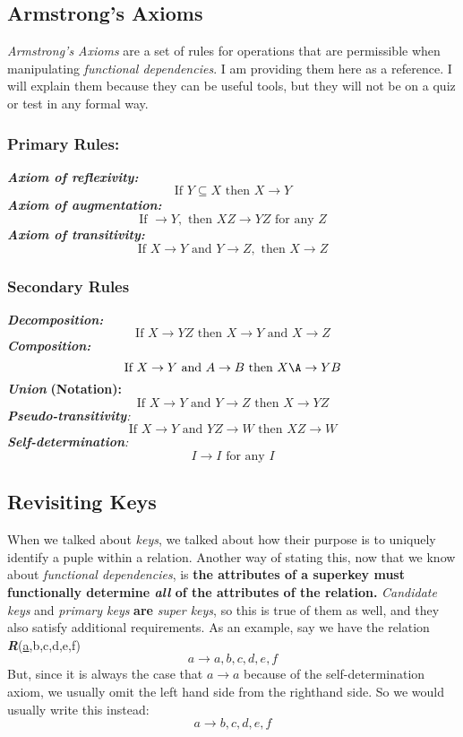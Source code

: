 \documentclass{report}
\begin{document}
\subsection{Armstrong's Axioms}
\textit{Armstrong's Axioms} are a set of rules for operations that are permissible when manipulating \textit{functional dependencies}. I am providing them here as a reference. I will explain them because they can be useful tools, but they will not be on a quiz or test in any formal way.
\subsubsection*{Primary Rules:}
\textit{\textbf{Axiom of reflexivity:}}
$$ \text{If } Y \subseteq X \text{ then } X \rightarrow Y$$
\textit{\textbf{Axiom of augmentation:}}
$$ \text{If } \rightarrow Y, \text{ then } XZ \rightarrow YZ \text{ for any } Z $$
\textit{\textbf{Axiom of transitivity:}}
$$ \text{If } X \rightarrow Y \text{ and } Y \rightarrow Z, \text{ then } X \rightarrow Z$$
\subsubsection*{Secondary Rules}
\textit{\textbf{Decomposition:}}
$$ \text{If } X \rightarrow YZ \text{ then } X \rightarrow Y \text{ and } X \rightarrow Z $$
\textit{\textbf{Composition:}}
$$ \text{If } X \rightarrow Y \text{ and } A \rightarrow B \text{ then } X\A \rightarrow YB$$
\textit{\textbf{Union}}\textbf{ (Notation):}
$$ \text{If } X \rightarrow Y \text{ and } Y \rightarrow Z \text{ then } X \rightarrow YZ $$
\textit{\textbf{Pseudo-transitivity}:}
$$ \text{If } X \rightarrow Y \text{ and } YZ \rightarrow W \text{ then } XZ \rightarrow W $$
\textit{\textbf{Self-determination}:}
$$ I \rightarrow I \text{ for any } I $$
\subsection{Revisiting Keys}
When we talked about \textit{keys}, we talked about how their purpose is to uniquely identify a puple within a relation. Another way of stating this, now that we know about \textit{functional dependencies}, is \textbf{the attributes of a \textbf{superkey} must functionally determine \textit{all} of the attributes of the relation.}
\bigbreak \noindent
\textit{Candidate keys} and \textit{primary keys} \textbf{are} \textit{super keys}, so this is true of them as well, and they also satisfy additional requirements. As an example, say we have the relation \textit{\textbf{R}}(\underline{a},b,c,d,e,f)
$$ a \rightarrow a,b,c,d,e,f$$
But, since it is always the case that $a \rightarrow a$ because of the self-determination axiom, we usually omit the left hand side from the righthand side. So we would usually write this instead:
$$ a \rightarrow b,c,d,e,f$$
\end{document}
